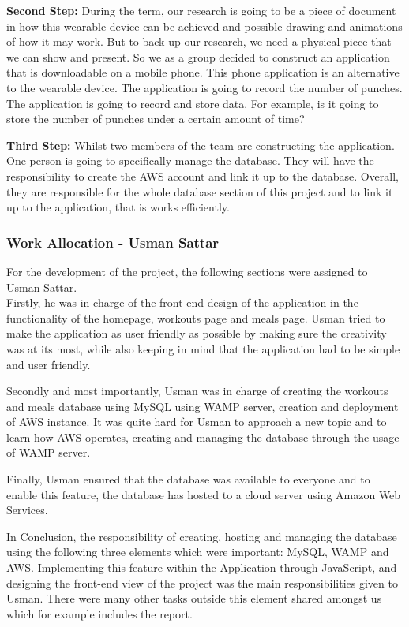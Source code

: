 \documentclass[a4paper,12pt]{report}
\begin{document}
\textbf{Second Step:}
During the term, our research is going to be a piece of document in how this wearable device can be achieved and possible drawing and animations of how it may work. But to back up our research, we need a physical piece that we can show and present. So we as a group decided to construct an application that is downloadable on a mobile phone. This phone application is an alternative to the wearable device. The application is going to record the number of punches. The application is going to record and store data. For example, is it going to store the number of punches under a certain amount of time?

\textbf{Third Step:}
Whilst two members of the team are constructing the application. One person is going to specifically manage the database. They will have the responsibility to create the AWS account and link it up to the database. Overall, they are responsible for the whole database section of this project and to link it up to the application, that is works efficiently.

\subsubsection{Work Allocation - Usman Sattar}
For the development of the project, the following sections were assigned to Usman Sattar.\\
Firstly, he was in charge of the front-end design of the application in the functionality of the homepage, workouts page and meals page. Usman tried to make the application as user friendly as possible by making sure the creativity was at its most, while also keeping in mind that the application had to be simple and user friendly.

Secondly and most importantly, Usman was in charge of creating the workouts and meals database using MySQL using WAMP server, creation and deployment of AWS instance. It was quite hard for Usman to approach a new topic and to learn how AWS operates, creating and managing the database through the usage of WAMP server.

Finally, Usman ensured that the database was available to everyone and to enable this feature, the database has hosted to a cloud server using Amazon Web Services.

In Conclusion, the responsibility of creating, hosting and managing the database using the following three elements which were important: MySQL, WAMP and AWS. Implementing this feature within the Application through JavaScript, and designing the front-end view of the project was the main responsibilities given to Usman. There were many other tasks outside this element shared amongst us which for example includes the report.
\end{document}
